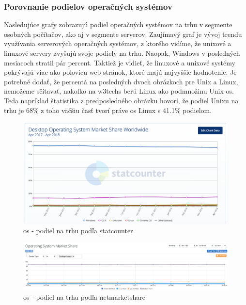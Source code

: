 \subsubsection{Porovnanie podielov operačných systémov}
\indent Nasledujúce grafy zobrazujú podiel operačných systémov na trhu v segmente osobných počítačov, ako aj v segmente serverov. Zaujímavý graf je vývoj trendu využívania serverových operačných systémov, z ktorého vidíme, že unixové a linuxové servery zvyšujú svoje podiely na trhu. Naopak, Windows v posledných mesiacoch stratil pár percent. Taktiež je vidieť, že linuxové a unixové systémy pokrývajú viac ako polovicu web stránok, ktoré majú najvyššie hodnotenie. Je potrebné dodať, že percentá na posledných dvoch obrázkoch pre Unix a Linux, nemožeme sčítavať, nakoľko na w3techs berú Linux ako podmnožinu Unix \acrshort{os}. Teda napríklad štatistika z predposledného obrázku hovorí, že podiel Unixu na trhu je 68\% z toho väčšiu časť tvorí práve \acrshort{os} Linux s 41.1\% podielom.
\begin{figure}[H]
	\centering
	\includegraphics[width=\linewidth]{img/statcounter.png}
	\caption{\acrshort{os} - podiel na trhu podľa statcounter\cite{statcounter}}
	\label{fig:test}
	
\end{figure}
\begin{figure}[H]
	\centering
	\includegraphics[width=\linewidth]{img/netmarketshare.png}
	\caption{\acrshort{os} - podiel na trhu podľa netmarketshare\cite{netmarketshare}}
	\label{fig:test}
	
\end{figure}
